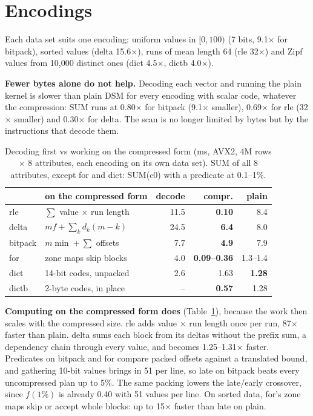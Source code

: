 \section{Encodings}
Each data set suits one encoding: uniform values in $[0, 100)$ (7 bits, 9.1$\times$ for
bitpack), sorted values (delta 15.6$\times$), runs of mean length 64 (rle 32$\times$) and Zipf
values from 10,000 distinct ones (dict 4.5$\times$, dictb 4.0$\times$).

\textbf{Fewer bytes alone do not help.} Decoding each vector and running the plain kernel is
slower than plain DSM for every encoding with scalar code, whatever the compression: SUM runs at
0.80$\times$ for bitpack (9.1$\times$ smaller), 0.69$\times$ for rle (32$\times$ smaller) and
0.30$\times$ for delta. The scan is no longer limited by bytes but by the instructions that
decode them.

\begin{table}[t]
\caption{Decoding first vs working on the compressed form (ms, AVX2, 4M rows $\times$ 8
attributes, each encoding on its own data set). SUM of all 8 attributes, except for and dict:
SUM(c0) with a predicate at 0.1--1\%.}
\label{tab:encodings}
\small
\begin{tabular}{llrrr}
\toprule
 & on the compressed form & decode & compr. & plain \\
\midrule
rle & $\sum$ value $\times$ run length & 11.5 & \textbf{0.10} & 8.4 \\
delta & $m f + \sum_k d_k (m-k)$ & 24.5 & \textbf{6.4} & 8.0 \\
bitpack & $m \min + \sum$ offsets & 7.7 & \textbf{4.9} & 7.9 \\
for & zone maps skip blocks & 4.0 & \textbf{0.09--0.36} & 1.3--1.4 \\
dict & 14-bit codes, unpacked & 2.6 & 1.63 & \textbf{1.28} \\
dictb & 2-byte codes, in place & -- & \textbf{0.57} & 1.28 \\
\bottomrule
\end{tabular}
\end{table}

\textbf{Computing on the compressed form does} (Table~\ref{tab:encodings}), because the work
then scales with the compressed size. rle adds value $\times$ run length once per run, 87$\times$
faster than plain. delta sums each block from its deltas without the prefix sum, a dependency
chain through every value, and becomes 1.25--1.31$\times$ faster. Predicates on bitpack and for
compare packed offsets against a translated bound, and gathering 10-bit values brings in 51 per
line, so late on bitpack beats every uncompressed plan up to 5\%. The same packing lowers the
late/early crossover, since $f(1\%)$ is already 0.40 with 51 values per line. On sorted data,
for's zone maps skip or accept whole blocks: up to 15$\times$ faster than late on plain.

